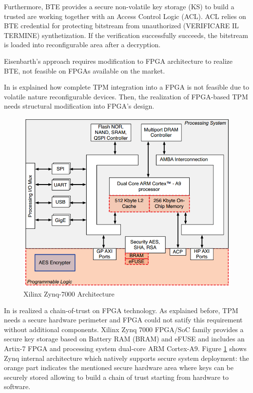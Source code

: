 \documentclass[../tesi.tex]{subfiles}
\begin{document}
Furthermore, BTE provides a secure non-volatile key storage (KS) to build a trusted are working together with an Access Control Logic (ACL). ACL relies on BTE credential for protecting bitstream from unauthorized (VERIFICARE IL TERMINE) synthetization. 
If the verification successfully succeeds, the bitstream is loaded into reconfigurable area after a decryption.
 
Eisenbarth's approach requires modification to FPGA architecture to realize BTE, not feasible on FPGAs available on the market.

In \cite{glas2009configuration} is explained how complete TPM integration into a FPGA is not feasible due to volatile nature reconfigurable devices. Then, the realization of FPGA-based TPM needs structural modification into FPGA's design.

\begin{figure}
\centering
\includegraphics[scale=0.32]{images/zynqarchitecture.png}
\caption{Xilinx Zynq-7000 Architecture}
\label{fig:zynqarchitecture}
\end{figure}
In \cite{barbareschi2014advancing} is realized a chain-of-trust on FPGA technology. As explained before, TPM needs a secure hardware perimeter and FPGA could not satify this requirement without additional components. 
Xilinx Zynq 7000 FPGA/SoC family provides a secure key storage based on Battery RAM (BRAM) and eFUSE and includes an Artix-7 FPGA and processing system dual-core ARM Cortex-A9. 
Figure \ref{fig:zynqarchitecture} shows Zynq internal architecture which natively supports secure system deployment: the orange part indicates the mentioned secure hardware area where keys can be securely stored allowing to build a chain of trust starting from hardware to software.
\end{document}
